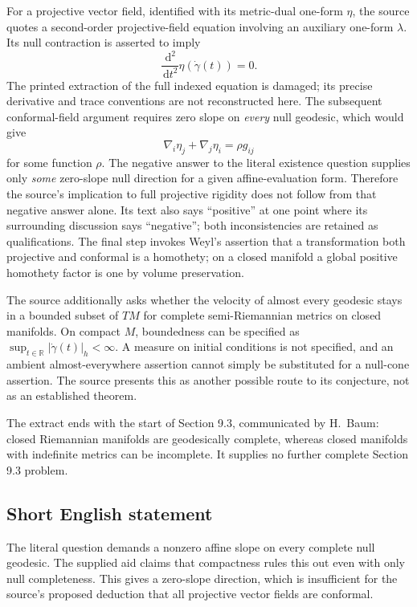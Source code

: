 \documentclass[11pt]{article}
\newcommand{\R}{\mathbb{R}}
\newcommand{\dd}{\,\mathrm{d}}
\begin{document}
For a projective vector field, identified with its metric-dual one-form $\eta$, the source quotes a second-order projective-field equation involving an auxiliary one-form $\lambda$. Its null contraction is asserted to imply
\[
 \frac{\dd^2}{\dd t^2}\eta(\dot\gamma(t))=0.
\]
The printed extraction of the full indexed equation is damaged; its precise derivative and trace conventions are not reconstructed here. The subsequent conformal-field argument requires zero slope on \emph{every} null geodesic, which would give
\[
 \nabla_i\eta_j+\nabla_j\eta_i=\rho g_{ij}
\]
for some function $\rho$. The negative answer to the literal existence question supplies only \emph{some} zero-slope null direction for a given affine-evaluation form. Therefore the source's implication to full projective rigidity does not follow from that negative answer alone. Its text also says ``positive'' at one point where its surrounding discussion says ``negative''; both inconsistencies are retained as qualifications. The final step invokes Weyl's assertion that a transformation both projective and conformal is a homothety; on a closed manifold a global positive homothety factor is one by volume preservation.

The source additionally asks whether the velocity of almost every geodesic stays in a bounded subset of $TM$ for complete semi-Riemannian metrics on closed manifolds. On compact $M$, boundedness can be specified as $\sup_{t\in\R}|\dot\gamma(t)|_h<\infty$. A measure on initial conditions is not specified, and an ambient almost-everywhere assertion cannot simply be substituted for a null-cone assertion. The source presents this as another possible route to its conjecture, not as an established theorem.

The extract ends with the start of Section 9.3, communicated by H.~Baum: closed Riemannian manifolds are geodesically complete, whereas closed manifolds with indefinite metrics can be incomplete. It supplies no further complete Section 9.3 problem.
\subsection{Short English statement}
The literal question demands a nonzero affine slope on every complete null geodesic. The supplied aid claims that compactness rules this out even with only null completeness. This gives a zero-slope direction, which is insufficient for the source's proposed deduction that all projective vector fields are conformal.
\end{document}
